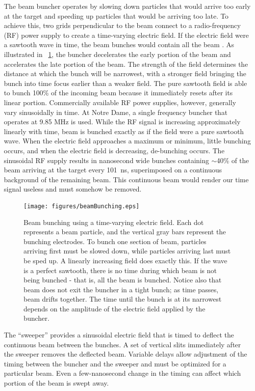 The beam buncher operates by slowing down particles that would arrive too early at the target and speeding up particles that would be arriving too late.  To achieve this, two grids perpendicular to the beam connect to a radio-frequency (RF) power supply to create a time-varying electric field.  If the electric field were a sawtooth wave in time, the beam bunches would contain all the beam \citep{LynchBunching}.  As illustrated in {\fig}~\ref{fig:bunching}, the buncher decelerates the early portion of the beam and accelerates the late portion of the beam.  The strength of the field determines the distance at which the bunch will be narrowest, with a stronger field bringing the bunch into time focus earlier than a weaker field.  The pure sawtooth field is able to bunch 100\% of the incoming beam because it immediately resets after its linear portion.  Commercially available RF power supplies, however, generally vary sinusoidally in time.  At Notre Dame, a single frequency buncher that operates at 9.85 MHz is used.  While the RF signal is increasing approximately linearly with time, beam is bunched exactly as if the field were a pure sawtooth wave.  When the electric field approaches a maximum or minimum, little bunching occurs, and when the electric field is decreasing, de-bunching occurs.  The sinusoidal RF supply results in nanosecond wide bunches containing $\sim$40\% of the beam arriving at the target every 101~ns, superimposed on a continuous background of the remaining beam.  This continuous beam would render our time signal useless and must somehow be removed.

\begin{figure}[htp]
\centering
\texttt{[image: figures/beamBunching.eps]}
\caption[Beam bunching.]{Beam bunching using a time-varying electric field.  Each dot represents a beam particle, and the vertical gray bars represent the bunching electrodes.  To bunch one section of beam, particles arriving first must be slowed down, while particles arriving last must be sped up.  A linearly increasing field does exactly this.  If the wave is a perfect sawtooth, there is no time during which beam is not being bunched - that is, all the beam is bunched.  Notice also that beam does not exit the buncher in a tight bunch; as time passes, beam drifts together.  The time until the bunch is at its narrowest depends on the amplitude of the electric field applied by the buncher.}
\label{fig:bunching}
\end{figure}

The ``sweeper'' provides a sinusoidal electric field that is timed to deflect the continuous beam between the bunches.  A set of vertical slits immediately after the sweeper removes the deflected beam.  Variable delays allow adjustment of the timing between the buncher and the sweeper and must be optimized for a particular beam.  Even a few-nanosecond change in the timing can affect which portion of the beam is swept away. 

